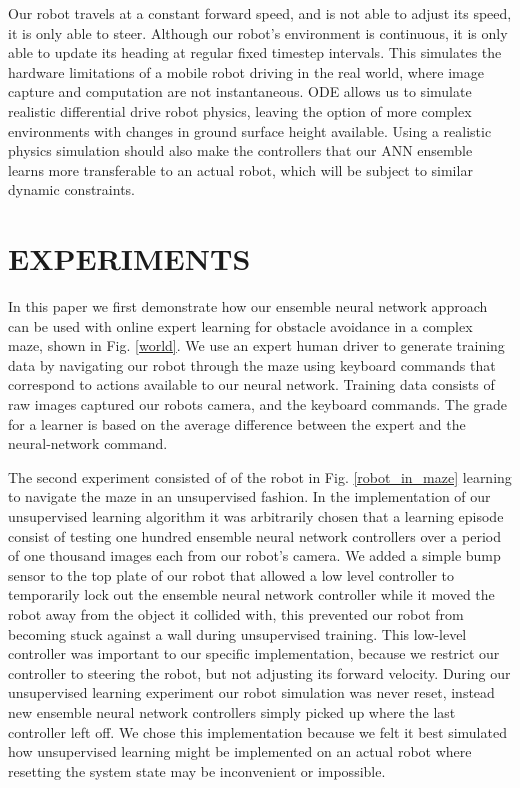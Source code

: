 \documentclass{article}
\begin{document}
		Our robot travels at a constant forward speed, and is not able to adjust its speed, it is only able to steer.  Although our robot's environment is continuous, it is only able to update its heading at regular fixed timestep intervals.  This simulates the hardware limitations of a mobile robot driving in the real world, where image capture and computation are not instantaneous.  ODE allows us to simulate realistic differential drive robot physics, leaving the option of more complex environments with changes in ground surface height available.  Using a realistic physics simulation should also make the controllers that our ANN ensemble learns more transferable to an actual robot, which will be subject to similar dynamic constraints.

\section{EXPERIMENTS}
\label{sec:ex}

	In this paper we first demonstrate how our ensemble neural network approach can be used with online expert learning for obstacle avoidance in a complex maze, shown in Fig. \ref{world}. We use an expert human driver to generate training data by navigating our robot through the maze using keyboard commands that correspond to actions available to our neural network.  Training data consists of raw images captured our robots camera, and the keyboard commands.  The grade for a learner is based on the average difference between the expert and the neural-network command.

	The second experiment consisted of of the robot in Fig. \ref{robot_in_maze} learning to navigate the maze in an unsupervised fashion.  In the implementation of our unsupervised learning algorithm it was arbitrarily chosen that a learning episode consist of testing one hundred ensemble neural network controllers over a period of one thousand images each from our robot's camera.  We added a simple bump sensor to the top plate of our robot that allowed a low level controller to temporarily lock out the ensemble neural network controller while it moved the robot  away from the object it collided with, this prevented our robot from becoming stuck against a wall during unsupervised training.  This low-level controller was important to our specific implementation, because we restrict our controller to steering the robot, but not adjusting its forward velocity.  During our unsupervised learning experiment our robot simulation was never reset, instead new ensemble neural network controllers simply picked up where the last controller left off.  We chose this implementation because we felt it best simulated how unsupervised learning might be implemented on an actual robot where resetting the system state may be inconvenient or impossible.
\end{document}
